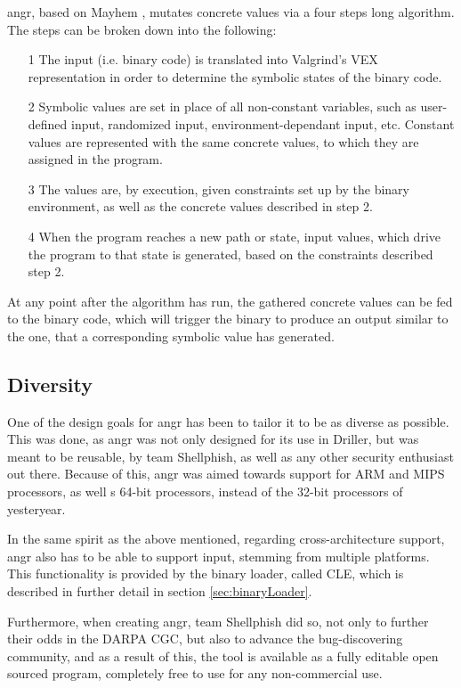 \documentclass[a4paper]{article}
\begin{document}
angr, based on Mayhem \cite{Mayhem}, mutates concrete values via a four steps long algorithm. The steps can be broken down into the following:
\begin{itemize}
	\item[1] The input (i.e. binary code) is translated into Valgrind's VEX \cite{VEX} representation in order to determine the symbolic states of the binary code.
	\item[2] Symbolic values are set in place of all non-constant variables, such as user-defined input, randomized input, environment-dependant input, etc. Constant values are represented with the same concrete values, to which they are assigned in the program.
	\item[3] The values are, by execution, given constraints set up by the binary environment, as well as the concrete values described in step 2.
	\item[4] When the program reaches a new path or state, input values, which drive the program to that state is generated, based on the constraints described step 2.
\end{itemize}
At any point after the algorithm has run, the gathered concrete values can be fed to the binary code, which will trigger the binary to produce an output similar to the one, that a corresponding symbolic value has generated.
\subsection{Diversity}
\label{sec:Diversityangr}
One of the design goals for angr has been to tailor it to be as diverse as possible. This was done, as angr was not only designed for its use in Driller, but was meant to be reusable, by team Shellphish, as well as any other security enthusiast out there. Because of this, angr was aimed towards support for ARM and MIPS processors, as well s 64-bit processors, instead of the 32-bit processors of yesteryear.

In the same spirit as the above mentioned, regarding cross-architecture support, angr also has to be able to support input, stemming from multiple platforms. This functionality is provided by the binary loader, called CLE, which is described in further detail in section \ref{sec:binaryLoader}.

Furthermore, when creating angr, team Shellphish did so, not only to further their odds in the DARPA CGC, but also to advance the bug-discovering community, and as a result of this, the tool is available as a fully editable open sourced program, completely free to use for any non-commercial use.
\end{document}
